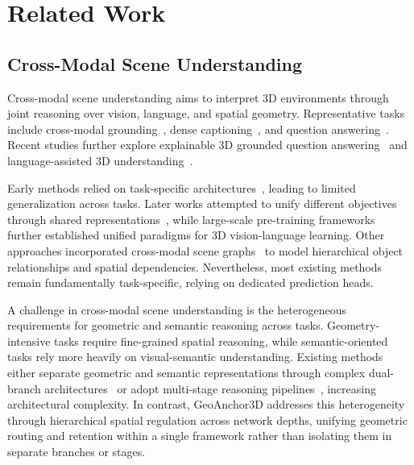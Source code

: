 \documentclass[lettersize,journal]{IEEEtran}
\begin{document}
\section{Related Work}

\subsection{Cross-Modal Scene Understanding}
Cross-modal scene understanding aims to interpret 3D environments through joint reasoning over vision, language, and spatial geometry. Representative tasks include cross-modal grounding~\cite{scanrefer2020, referit3d2020, multi3drefer2023}, dense captioning~\cite{scan2cap2021, Vote2Cap-DETR++2024, deng2024cdkm}, and question answering~\cite{scanqa2022, sqa3d2023}. Recent studies further explore explainable 3D grounded question answering~\cite{zhao2023fe3dgqa} and language-assisted 3D understanding~\cite{wu2025lastpcl}. 

Early methods relied on task-specific architectures~\cite{scanrefer2020, scan2cap2021}, leading to limited generalization across tasks. Later works attempted to unify different objectives through shared representations~\cite{3djcg2022, d3net2022}, while large-scale pre-training frameworks~\cite{3dvlp2023, 3dvista2023} further established unified paradigms for 3D vision-language learning. Other approaches incorporated cross-modal scene graphs~\cite{wei20243dsgg, feng2025hierarchical} to model hierarchical object relationships and spatial dependencies. Nevertheless, most existing methods remain fundamentally task-specific, relying on dedicated prediction heads.

A challenge in cross-modal scene understanding is the heterogeneous requirements for geometric and semantic reasoning across tasks. Geometry-intensive tasks require fine-grained spatial reasoning, while semantic-oriented tasks rely more heavily on visual-semantic understanding. Existing methods either separate geometric and semantic representations through complex dual-branch architectures~\cite{spatial-mllm2025} or adopt multi-stage reasoning pipelines~\cite{scenecot2025}, increasing architectural complexity. 
In contrast, GeoAnchor3D addresses this heterogeneity through hierarchical spatial regulation { across network depths, unifying geometric routing and retention within a single framework rather than isolating them in separate branches or stages.} 
\end{document}
